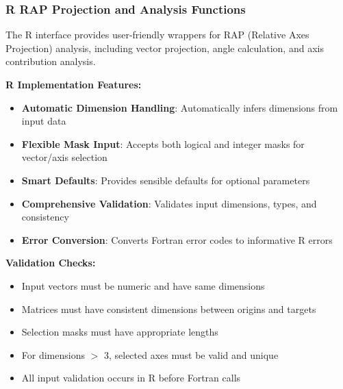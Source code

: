 \subsubsection{R RAP Projection and Analysis Functions}

The R interface provides user-friendly wrappers for RAP (Relative Axes Projection) analysis, including vector projection, angle calculation, and axis contribution analysis.

\textbf{R Implementation Features:}
\begin{itemize}
    \item \textbf{Automatic Dimension Handling}: Automatically infers dimensions from input data
    \item \textbf{Flexible Mask Input}: Accepts both logical and integer masks for vector/axis selection
    \item \textbf{Smart Defaults}: Provides sensible defaults for optional parameters
    \item \textbf{Comprehensive Validation}: Validates input dimensions, types, and consistency
    \item \textbf{Error Conversion}: Converts Fortran error codes to informative R errors
\end{itemize}

\textbf{Validation Checks:}
\begin{itemize}
    \item Input vectors must be numeric and have same dimensions
    \item Matrices must have consistent dimensions between origins and targets
    \item Selection masks must have appropriate lengths
    \item For dimensions $>$ 3, selected axes must be valid and unique
    \item All input validation occurs in R before Fortran calls
\end{itemize}

